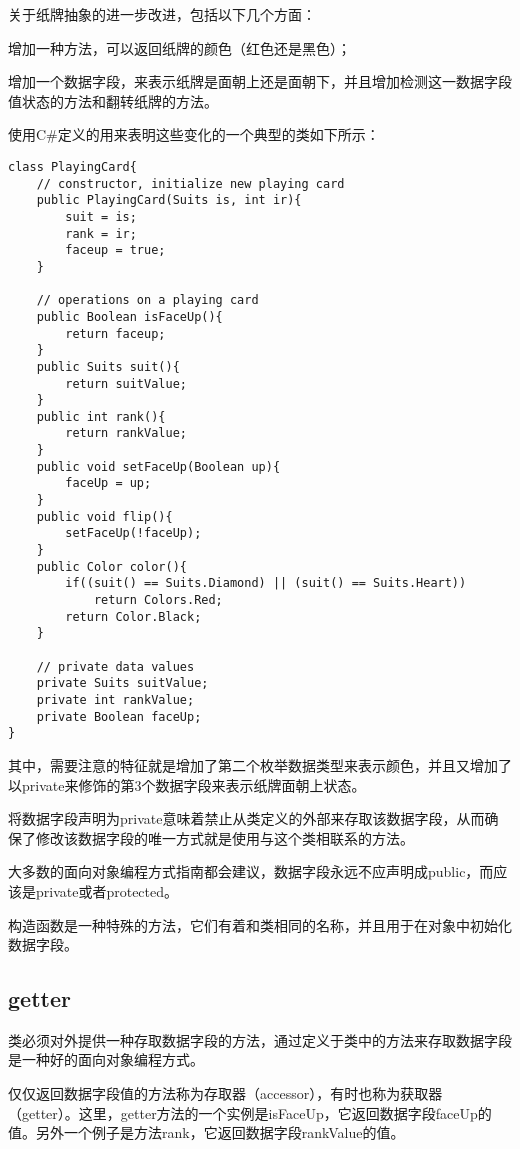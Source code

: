 关于纸牌抽象的进一步改进，包括以下几个方面：

\begin{compactitem}
\item 增加一种方法，可以返回纸牌的颜色（红色还是黑色）；
\item 增加一个数据字段，来表示纸牌是面朝上还是面朝下，并且增加检测这一数据字段值状态的方法和翻转纸牌的方法。
\end{compactitem}


使用C\#定义的用来表明这些变化的一个典型的类如下所示：

\begin{lstlisting}[language={[Sharp]C}]
class PlayingCard{
	// constructor, initialize new playing card
	public PlayingCard(Suits is, int ir){
		suit = is;
		rank = ir;
		faceup = true;
	}
	
	// operations on a playing card
	public Boolean isFaceUp(){
		return faceup;
	}
	public Suits suit(){
		return suitValue;
	}
	public int rank(){
		return rankValue;
	}
	public void setFaceUp(Boolean up){
		faceUp = up;
	}
	public void flip(){
		setFaceUp(!faceUp);
	}
	public Color color(){
		if((suit() == Suits.Diamond) || (suit() == Suits.Heart))
			return Colors.Red;
		return Color.Black;
	}
	
	// private data values
	private Suits suitValue;
	private int rankValue;
	private Boolean faceUp;
}
\end{lstlisting}



其中，需要注意的特征就是增加了第二个枚举数据类型来表示颜色，并且又增加了以private来修饰的第3个数据字段来表示纸牌面朝上状态。

将数据字段声明为private意味着禁止从类定义的外部来存取该数据字段，从而确保了修改该数据字段的唯一方式就是使用与这个类相联系的方法。

大多数的面向对象编程方式指南都会建议，数据字段永远不应声明成public，而应该是private或者protected。

构造函数是一种特殊的方法，它们有着和类相同的名称，并且用于在对象中初始化数据字段。

\subsection{getter}


类必须对外提供一种存取数据字段的方法，通过定义于类中的方法来存取数据字段是一种好的面向对象编程方式。

仅仅返回数据字段值的方法称为存取器（accessor），有时也称为获取器（getter）。这里，getter方法的一个实例是isFaceUp，它返回数据字段faceUp的值。另外一个例子是方法rank，它返回数据字段rankValue的值。


